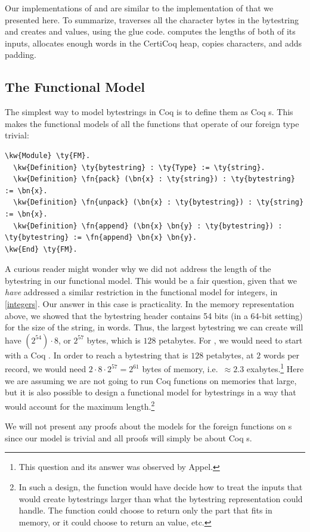 Our implementations of  and  are similar to the implementation of  that we presented here. To summarize,  traverses all the character bytes in the bytestring and creates  and  values, using the \gls{glue code}.  computes the lengths of both of its inputs, allocates enough words in the \gls{CertiCoq heap}, copies characters, and adds padding.

\subsection{The Functional Model}

The simplest way to model bytestrings in Coq is to define them as Coq s. This makes the \gls{functional model}s of all the functions that operate of our \gls{foreign type} trivial:

\begin{Verbatim}
\kw{Module} \ty{FM}.
  \kw{Definition} \ty{bytestring} : \ty{Type} := \ty{string}.
  \kw{Definition} \fn{pack} (\bn{x} : \ty{string}) : \ty{bytestring} := \bn{x}.
  \kw{Definition} \fn{unpack} (\bn{x} : \ty{bytestring}) : \ty{string} := \bn{x}.
  \kw{Definition} \fn{append} (\bn{x} \bn{y} : \ty{bytestring}) : \ty{bytestring} := \fn{append} \bn{x} \bn{y}.
\kw{End} \ty{FM}.
\end{Verbatim}

A curious reader might wonder why we did not address the length of the bytestring in our \gls{functional model}. This would be a fair question, given that we \emph{have} addressed a similar restriction in the \gls{functional model} for integers, in \autoref{integers}. Our answer in this case is practicality. In the memory representation above, we showed that the bytestring header contains 54 bits (in a 64-bit setting) for the size of the string, in words. Thus, the largest bytestring we can create will have $(2^{54})\cdot{}8$, or $2^{57}$ bytes, which is $128$ petabytes.
For , we would need to start with a Coq . In order to reach a bytestring that is $128$ petabytes, at $2$ words per record, we would need $2\cdot{}8\cdot{}2^{57} = 2^{61}$ bytes of memory, i.e.\ $\approx{}2.3$ exabytes.\footnote{This question and its answer was observed by Appel.}  Here we are assuming we are not going to run Coq functions on memories that large, but it is also possible to design a \gls{functional model} for bytestrings in a way that would account for the maximum length.\footnote{In such a design, the  function would have decide how to treat the inputs that would create bytestrings larger than what the bytestring representation could handle. The  function could choose to return only the part that fits in memory, or it could choose to return an  value, etc.}

We will not present any proofs about the models for the \gls{foreign function}s on s since our model is trivial and all proofs will simply be about Coq s.